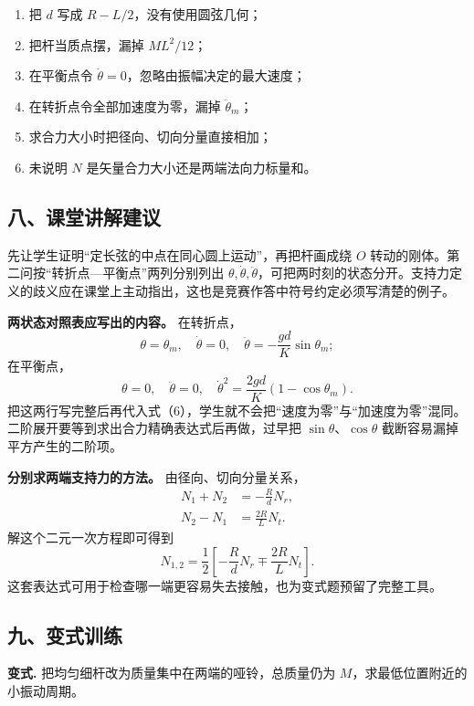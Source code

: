 \documentclass[12pt,a4paper,UTF8]{ctexart}
\newcommand{\tightlist}{\setlength{\itemsep}{0pt}\setlength{\parskip}{0pt}}
\begin{document}
\begin{enumerate}
\def\labelenumi{\arabic{enumi}.}
\tightlist
\item
  把 \(d\) 写成 \(R-L/2\)，没有使用圆弦几何；
\item
  把杆当质点摆，漏掉 \(ML^2/12\)；
\item
  在平衡点令 \(\dot\theta=0\)，忽略由振幅决定的最大速度；
\item
  在转折点令全部加速度为零，漏掉 \(\ddot\theta_m\)；
\item
  求合力大小时把径向、切向分量直接相加；
\item
  未说明 \(N\) 是矢量合力大小还是两端法向力标量和。
\end{enumerate}

\subsection{八、课堂讲解建议}\label{ux516bux8bfeux5802ux8bb2ux89e3ux5efaux8bae-1}

先让学生证明``定长弦的中点在同心圆上运动''，再把杆画成绕 \(O\)
转动的刚体。第二问按``转折点---平衡点''两列分别列出
\(\theta,\dot\theta,\ddot\theta\)，可把两时刻的状态分开。支持力定义的歧义应在课堂上主动指出，这也是竞赛作答中符号约定必须写清楚的例子。

\textbf{两状态对照表应写出的内容。} 在转折点， \[
\theta=\theta_m,\quad \dot\theta=0,\quad
\ddot\theta=-\frac{gd}{K}\sin\theta_m;
\] 在平衡点， \[
\theta=0,\quad \ddot\theta=0,\quad
\dot\theta^2=\frac{2gd}{K}(1-\cos\theta_m).
\]
把这两行写完整后再代入式（6），学生就不会把``速度为零''与``加速度为零''混同。二阶展开要等到求出合力精确表达式后再做，过早把
\(\sin\theta\)、\(\cos\theta\) 截断容易漏掉平方产生的二阶项。

\textbf{分别求两端支持力的方法。} 由径向、切向分量关系， \[
\begin{aligned}
N_1+N_2&=-\frac RdN_r,\\
N_2-N_1&=\frac{2R}{L}N_t.
\end{aligned}
\] 解这个二元一次方程即可得到 \[
N_{1,2}=\frac12\left[
-\frac RdN_r\mp\frac{2R}{L}N_t
\right].
\] 这套表达式可用于检查哪一端更容易失去接触，也为变式题预留了完整工具。

\subsection{九、变式训练}\label{ux4e5dux53d8ux5f0fux8badux7ec3-1}

\textbf{变式.} 把均匀细杆改为质量集中在两端的哑铃，总质量仍为
\(M\)，求最低位置附近的小振动周期。
\end{document}
